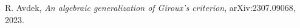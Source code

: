\documentclass[11pt]{amsart}
\begin{document}
\begin{thebibliography}{}
R. Avdek, \textit{An algebraic generalization of Giroux's criterion}, arXiv:2307.09068, 2023.

\begin{comment}
\bibitem[BH15]{BH:ContactDefinition}
E. Bao and K. Honda, \textit{Semi-global Kuranishi charts and the definition of contact homology}, arXiv:1512.00580, 2015.

\bibitem[BH18]{BH:Cylindrical}
E. Bao and K. Honda, \textit{Definition of cylindrical contact homology in dimension three}, Journ. of Topology, Vol. 11, No. 4, p.1002-1053, 2018.


\bibitem[BM]{SmoothAtlas}
D. Bar-Natan, S. Morrison, et. al, \textit{The Rolfsen knot table}, \url{http://katlas.org/wiki/The_Rolfsen_Knot_Table}

\bibitem[Bj16]{Bjorklund:LCH}
J. Bj\"{o}rklund, \textit{Legendrian contact homology in the product of a punctured Riemann surface and the real line}, Journal of the London Math. Soc., Vol. 94, no 3, p.970-992, 2016.

\bibitem[BEM15]{BEM:OT}
M. S. Borman, Y. Eliashberg, and E. Murphy, \textit{Existence and classification of overtwisted contact structures in all dimensions}, Acta Math. 215, p.281–361, 2015.

\bibitem[B02]{Bourgeois:Thesis}
F. Bourgeois, \textit{A Morse-Bott approach to contact homology}, PhD thesis, Stanford University, 2002.

\bibitem[B03]{Bourgeois:ContactIntro} 
F. Bourgeois, \textit{Introduction to contact homology}, lecture notes available at \url{https://www.imo.universite-paris-saclay.fr/~bourgeois/papers/Berder.pdf}, 2003.

\bibitem[BC14]{BC:Bilinearized}
F. Bourgeois and B. Chantraine, \textit{Bilinearized Legendrian contact homology and the augmentation category}, J. Symplectic Geom., Volume 12, p.553–583, 2014.

\bibitem[BG19]{BG:Bilinearized}
F. Bourgeois and D. Galant, \textit{Geography of bilinearized Legendrian contact homology}, arXiv:1905.12037, 2019.


\bibitem[BM03]{BM:Orientations}
F. Bourgeois and K. Mohnke, \textit{Coherent orientations in symplectic field theory}, Math. Z. 248, p.123-146, 2003.

\bibitem[BEE11]{BEE:Product}
F. Bourgeois, T. Ekholm, and Y. Eliashberg, \textit{Symplectic homology product via Legendrian surgery}, PNAS Volume 108, Number 20, p.8114-8121, 2011.

\bibitem[BEE12]{BEE:LegendrianSurgery}
F. Bourgeois, T. Ekholm, and Y. Eliashberg, \textit{Effect of Legendrain Surgery}, Geom. Topol., Volume 16, Number 1, p.301-389, 2012.


\end{comment}
\end{thebibliography}
\end{document}
